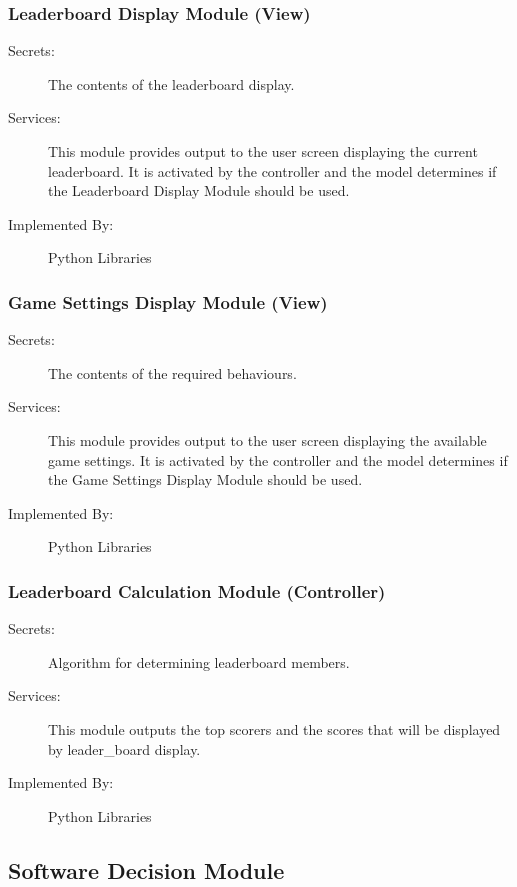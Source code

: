 \documentclass[12pt, titlepage]{article}
\begin{document}
\subsubsection{Leaderboard Display Module (View)}
\begin{description}
\item[Secrets:]The contents of the leaderboard display.
\item[Services:] This module provides output to the user screen displaying the current leaderboard. It is activated by the controller and the model determines if the Leaderboard Display Module should be used.
\item[Implemented By:] Python Libraries
\end{description}

\subsubsection{Game Settings Display Module (View)}
\begin{description}
\item[Secrets:]The contents of the required behaviours.
\item[Services:] This module provides output to the user screen displaying the available game settings. It is activated by the controller and the model determines if the Game Settings Display Module should be used. 
\item[Implemented By:] Python Libraries
\end{description}

\subsubsection{Leaderboard Calculation Module (Controller)}
\begin{description}
\item[Secrets:] Algorithm for determining leaderboard members.
\item[Services:] This module outputs the top scorers and the scores that will be displayed by leader\_board display.
\item[Implemented By:] Python Libraries
\end{description}

\subsection{Software Decision Module}
\end{document}
